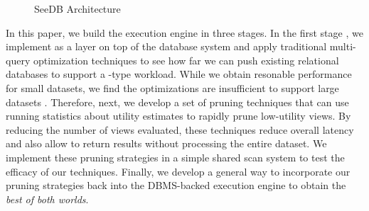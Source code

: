 \begin{figure}[htb]
\vspace{-10pt}
\centerline{
\hbox{}}
\vspace{-15pt}
\caption{SeeDB Architecture}
\label{fig:sys-arch}
\vspace{-15pt}
\end{figure} 

In this paper, we build the execution engine in three stages. 
In the first stage , we implement \SeeDB as a layer on top of the database system and apply traditional multi-query optimization techniques to see how far we can push existing relational databases to support a \SeeDB-type workload.
While we obtain resonable performance for small datasets, we find the optimizations are insufficient to support large datasets .
Therefore, next, we develop a set of pruning techniques that can use running statistics about utility estimates to rapidly prune low-utility views. 
By reducing the number of views evaluated, these techniques reduce overall latency and also allow \SeeDB to return results without processing the entire dataset.
We implement these pruning strategies in a simple shared scan system to test the efficacy of our techniques.
Finally, we develop a general way to incorporate our pruning strategies back into the DBMS-backed execution engine to obtain the {\it best of both worlds}.


